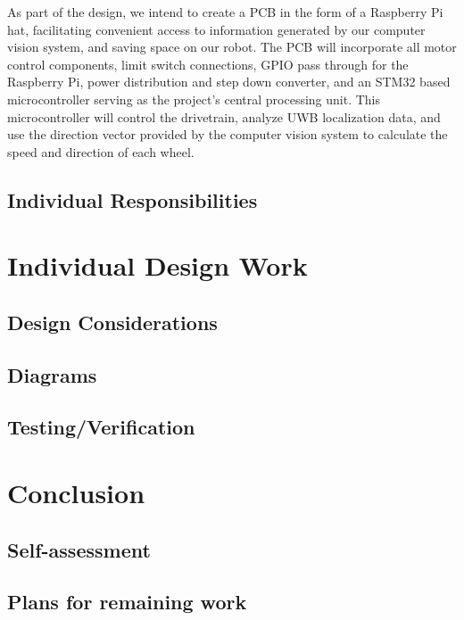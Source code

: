 \documentclass{report}
\begin{document}
    As part of the design, we intend to create a PCB in the form of a Raspberry Pi hat, facilitating convenient access to information generated by our computer vision system, and saving space on our robot. The PCB will incorporate all motor control components, limit switch connections, GPIO pass through for the Raspberry Pi, power distribution and step down converter, and an STM32 based microcontroller serving as the project's central processing unit. This microcontroller will control the drivetrain, analyze UWB localization data, and use the direction vector provided by the computer vision system to calculate the speed and direction of each wheel.

    \section{Individual Responsibilities}

    \chapter{Individual Design Work}
    \section{Design Considerations}

    \section{Diagrams}

    \section{Testing/Verification}

    \chapter{Conclusion}

    \section{Self-assessment}

    \section{Plans for remaining work}
\end{document}
